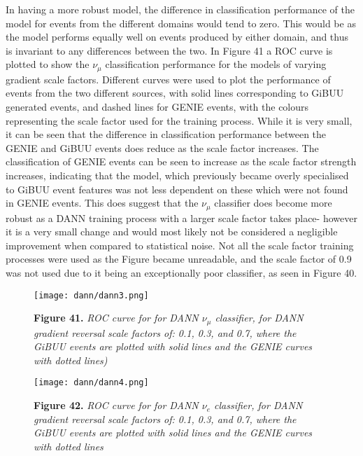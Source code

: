 \noindent In having a more robust model, the difference in classification performance of the model for events from the different domains would tend to zero. This would be as the model performs equally well on events produced by either domain, and thus is invariant to any differences between the two. In Figure 41 a ROC curve is plotted to show the $\nu_\mu$ classification performance for the models of varying gradient scale factors. Different curves were used to plot the performance of events from the two different sources, with solid lines corresponding to GiBUU generated events, and dashed lines for GENIE events, with the colours representing the scale factor used for the training process. While it is very small, it can be seen that the difference in classification performance between the GENIE and GiBUU events does reduce as the scale factor increases. The classification of GENIE events can be seen to increase as the scale factor strength increases, indicating that the model, which previously became overly specialised to GiBUU event features was not less dependent on these which were not found in GENIE events. This does suggest that the $\nu_\mu$ classifier does become more robust as a DANN training process with a larger scale factor takes place- however it is a very small change and would most likely not be considered a negligible improvement when compared to statistical noise. Not all the scale factor training processes were used as the Figure became unreadable, and the scale factor of 0.9 was not used due to it being an exceptionally poor classifier, as seen in Figure 40.\medskip

\begin{figure}[t!]
 \centering
 \texttt{[image: dann/dann3.png]}
 
 \textbf{Figure 41.} \textit{ROC curve for for DANN $\nu_\mu$ classifier, for DANN gradient reversal scale factors of: 0.1, 0.3, and 0.7, where the GiBUU events are plotted with solid lines and the GENIE curves with dotted lines)}
\end{figure}

\begin{figure}[t!]
 \centering
 \texttt{[image: dann/dann4.png]}
 
 \textbf{Figure 42.} \textit{ROC curve for for DANN $\nu_e$ classifier, for DANN gradient reversal scale factors of: 0.1, 0.3, and 0.7, where the GiBUU events are plotted with solid lines and the GENIE curves with dotted lines}
\end{figure}


